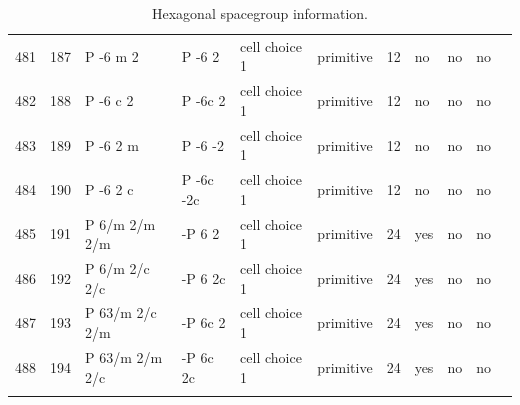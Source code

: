 \begin{center}
\begin{small}
\begin{longtable}{|l|l|l|l|l|l|l|l|l|l|l|}
481 &187 &P -6 m 2 &P -6 2 &cell choice 1 &primitive &12 &no &no &no \\ 
482 &188 &P -6 c 2 &P -6c 2 &cell choice 1 &primitive &12 &no &no &no \\ 
483 &189 &P -6 2 m &P -6 -2 &cell choice 1 &primitive &12 &no &no &no \\ 
484 &190 &P -6 2 c &P -6c -2c &cell choice 1 &primitive &12 &no &no &no \\ 
485 &191 &P 6/m 2/m 2/m &-P 6 2 &cell choice 1 &primitive &24 &yes &no &no \\ 
486 &192 &P 6/m 2/c 2/c &-P 6 2c &cell choice 1 &primitive &24 &yes &no &no \\ 
487 &193 &P 63/m 2/c 2/m &-P 6c 2 &cell choice 1 &primitive &24 &yes &no &no \\ 
488 &194 &P 63/m 2/m 2/c &-P 6c 2c &cell choice 1 &primitive &24 &yes &no &no \\ 
\hline
\caption{Hexagonal spacegroup information.}
\end{longtable}


\end{small}
\end{center}
